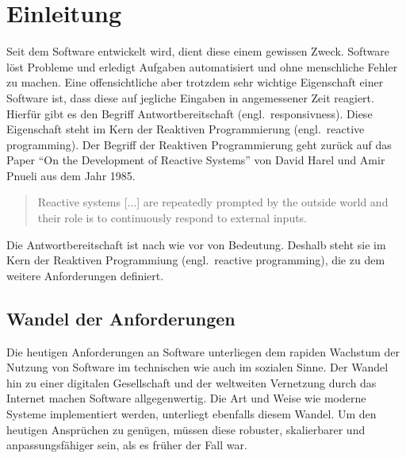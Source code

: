 \chapter{Einleitung}\label{sec:einleitung}

Seit dem Software entwickelt wird, dient diese einem gewissen Zweck. Software löst Probleme und erledigt Aufgaben automatisiert und ohne menschliche Fehler zu machen. Eine offensichtliche aber trotzdem sehr wichtige Eigenschaft einer Software ist, dass diese auf jegliche Eingaben in angemessener Zeit reagiert. Hierfür gibt es den Begriff Antwortbereitschaft (engl.\ responsivness). Diese Eigenschaft steht im Kern der Reaktiven Programmierung (engl.\ reactive programming). Der Begriff der Reaktiven Programmierung geht zurück auf das Paper \enquote{On the Development of Reactive Systems} von David Harel und Amir Pnueli aus dem Jahr 1985.~\cite{carkci_dataflow_2014}

\begin{quotation}
  Reactive systems [...] are repeatedly prompted by the outside world and their role is to continuously respond to external inputs.~\cite{harel_development_1985}
\end{quotation}

Die Antwortbereitschaft ist nach wie vor von Bedeutung. Deshalb steht sie im Kern der Reaktiven Programmiung (engl.\ reactive programming), die zu dem weitere Anforderungen definiert.~\cite[S. 18]{kuhn_reactive_2015}

\section{Wandel der Anforderungen}
Die heutigen Anforderungen an Software unterliegen dem rapiden Wachstum der Nutzung von Software im technischen wie auch im sozialen Sinne. Der Wandel hin zu einer digitalen Gesellschaft und der weltweiten Vernetzung durch das Internet machen Software allgegenwertig. Die Art und Weise wie moderne Systeme implementiert werden, unterliegt ebenfalls diesem Wandel. Um den heutigen Ansprüchen zu genügen, müssen diese robuster, skalierbarer und anpassungsfähiger sein, als es früher der Fall war.~\cite{boner_reactive_2014}

